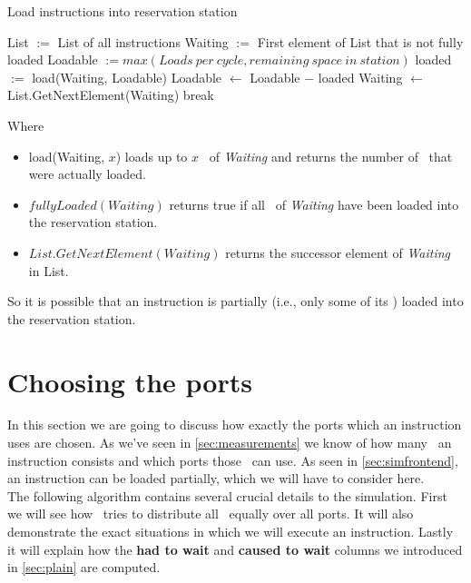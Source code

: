\begin{algorithm}[H]
    \SetAlgoLined
    \caption{Load instructions into reservation station}
    List $:=$ List of all instructions\;
    Waiting $:=$ First element of List that is not fully loaded\;
    Loadable $:= max(Loads\ per\ cycle, remaining\ space\ in\ station)$\;
     {
        loaded $:=$ load\microops(Waiting, Loadable)\;
        Loadable $\leftarrow$ Loadable $-$ loaded\;
         {
            Waiting $\leftarrow$ List.GetNextElement(Waiting)\;
        } {
            break\;
        }
    }
\end{algorithm}
\newpage
Where
\begin{itemize}
    \item load\microops(Waiting, $x$) loads up to $x$ \microops\ of \emph{Waiting} and returns the number of \microops\ that were actually loaded.
    \item $fullyLoaded(Waiting)$ returns true if all \microops\ of \emph{Waiting} have been loaded into the reservation station.
    \item $List.GetNextElement(Waiting)$ returns the successor element of \emph{Waiting} in List.
\end{itemize}

So it is possible that an instruction is partially (i.e., only some of its \microops) loaded into the reservation station.

\section{Choosing the ports}
\label{sec:chooseport}

In this section we are going to discuss how exactly the ports which an instruction uses are chosen. As we've seen in \autoref{sec:measurements} we know of how many \microops\ an instruction consists and which ports those \microops\ can use. As seen in \autoref{sec:simfrontend}, an instruction can be loaded partially, which we will have to consider here.\\
The following algorithm contains several crucial details to the simulation. First we will see how \suaca\ tries to distribute all \microops\ equally over all ports. It will also demonstrate the exact situations in which we will execute an instruction. Lastly it will explain how the \textbf{had to wait} and \textbf{caused to wait} columns we introduced in \autoref{sec:plain} are computed. 
\newpage


